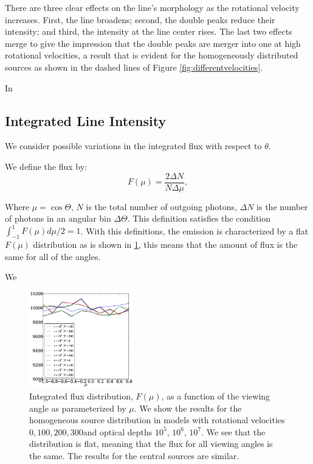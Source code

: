 \documentclass{emulateapj}
\newcommand{\kms}{{\ifmmode{{\mathrm{\,km\ s}^{-1}}}\else{\,km~s$^{-1}$}\fi}}
\begin{document}
There are three clear effects on the line's morphology as the
rotational velocity increases. First, the line broadens; second, the
double peaks reduce their intensity; and third, the intensity at the
line center rises. The last two effects merge to give the
impression that the double peaks are merger into one at high rotational
velocities, a result that is evident for the homogeneously distributed
sources as shown in the dashed lines of Figure
\ref{fig:differentvelocities}. 

In

\subsection{Integrated Line Intensity}

We consider possible variations in the integrated flux with respect to
$\theta$.

We define the flux by:
\begin{equation}
F(\mu) = \frac{2\Delta N}{N\Delta \mu}, 
\end{equation} 

Where $\mu=\cos\Theta$, $N$ is the total number of outgoing photons,
$\Delta N$ is the number of photons in an angular bin $\Delta
\Theta$. This definition satisfies the condition
$\int_{-1}^{1}F(\mu)d\mu/2=1$.  With this definitions, the 
emission is characterized by a flat $F(\mu)$ distribution as 
is shown in \ref{fig:muhisto}, this means that the amount of flux
is the same for all of the angles. 

We 

\begin{figure}
\begin{center}
  \includegraphics[width=0.4\textwidth]{muhisto.eps}
\end{center}
\caption{Integrated flux distribution, $F(\mu)$, as a function of the
  viewing angle as parameterized by $\mu$. We show the results for the
  homogeneous source distribution in models with rotational velocities
  $0,100,200,300$\kms and  optical depths $10^5$, $10^6$, $10^7$. We
  see that the distribution is flat, meaning that the flux for all
  viewing angles is the same. The results for the central sources are
  similar. 
\label{fig:muhisto}}
\end{figure}
	
\end{document}
